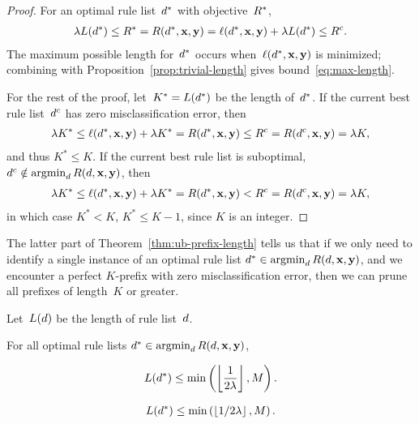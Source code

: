 \begin{arxiv}
\begin{proof}
For an optimal rule list~$d^*$ with objective~$R^*$,
\begin{align}
{\lambda} L(d^*) \le R^* = R(d^*, \mathbf{x}, \mathbf{y})
= \ell(d^*, \mathbf{x}, \mathbf{y}) + {\lambda} L(d^*)
\le {R^c}.
\end{align}
The maximum possible length for~$d^*$ occurs
when~$\ell(d^*, \mathbf{x}, \mathbf{y})$ is minimized;
combining with Proposition~\ref{prop:trivial-length}
gives bound~\eqref{eq:max-length}.

For the rest of the proof,
let~${K^* = L(d^*)}$ be the length of~$d^*$.
%
If the current best rule list~$d^c$ has zero
misclassification error, then
\begin{align}
{\lambda} K^* \leq \ell(d^*, \mathbf{x}, \mathbf{y}) + {\lambda} K^* = R(d^*, \mathbf{x}, \mathbf{y})
\le {R^c} = R(d^c, \mathbf{x}, \mathbf{y}) = {\lambda} K,
\end{align}
and thus ${K^* \leq K}$.
%
If the current best rule list is suboptimal,
\ie ${d^c \notin \operatorname*{argmin}_{d} R({d}, \mathbf{x}, \mathbf{y})}$, then
%
\begin{align}
{\lambda} K^* \leq \ell(d^*, \mathbf{x}, \mathbf{y}) + {\lambda} K^* = R(d^*, \mathbf{x}, \mathbf{y})
< {R^c} = R(d^c, \mathbf{x}, \mathbf{y}) = {\lambda} K,
\end{align}
in which case ${K^* < K}$, \ie ${K^* \leq K-1}$, since $K$ is an integer.
\end{proof}

The latter part of Theorem~\ref{thm:ub-prefix-length} tells us that
if we only need to identify a single instance of an optimal rule list
${d^* \in \operatorname*{argmin}_{d} R({d}, \mathbf{x}, \mathbf{y})}$, and we encounter a perfect
$K$-prefix with zero misclassification error, then we can prune all
prefixes of length~$K$ or greater.

\end{arxiv}

\begin{corollary}
\label{cor:ub-prefix-length}
\begin{arxiv}
Let~$L({d})$ be the length of rule list~${d}$.
\end{arxiv}
%
For all optimal rule lists ${d^* \in \operatorname*{argmin}_{d} R({d}, \mathbf{x}, \mathbf{y})}$,
\begin{arxiv}
\begin{align}
L(d^*) \le \min \left( \left\lfloor \frac{1}{2{\lambda}} \right\rfloor, M \right).
\label{eq:max-length-trivial}
\end{align}
\end{arxiv}
\begin{kdd}
\begin{align}
L(d^*) \le \min \left( \left\lfloor 1 / 2{\lambda} \right\rfloor, M \right).
\label{eq:max-length-trivial}
\end{align}
\end{kdd}
\end{corollary}

